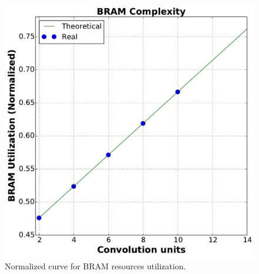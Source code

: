 \documentclass[conference,compsoc]{IEEEtran}
\begin{document}
\begin{figure}[!t]
\centering
\includegraphics[scale=0.3]{BRAM_c}
\caption{Normalized curve for BRAM resources utilization.}
\label{bram_n}
\end{figure}

%
%
\end{document}
